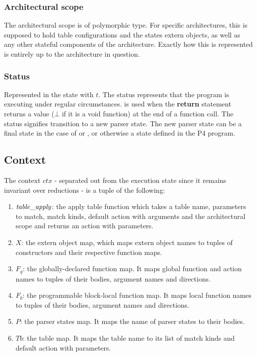 \documentclass[UTF8]{article}
\begin{document}
\subsubsection*{Architectural scope}
The architectural scope is of polymorphic type. For specific architectures, this is supposed to hold table configurations and the states extern objects, as well as any other stateful components of the architecture. Exactly how this is represented is entirely up to the architecture in question.

\subsubsection*{Status}
Represented in the state with $t$. The status \running{} represents that the program is executing under regular circumstances.  is used when the \textbf{return} statement returns a value \cval{} ($\bot$ if it is a void function) at the end of a function call. The status \trans{\vn{}} signifies transition to a new parser state. The new parser state can be a final state in the case of  or , or otherwise a state defined in the P4 program.

\subsection{Context}
The context $ctx$ - separated out from the execution state since it remains invariant over reductions - is a tuple of the following: 
\begin{enumerate}
   \item $\mathit{table\_apply}$: the apply table function which takes a table name, parameters to match, match kinds, default action with arguments and the architectural scope and returns an action with parameters.
   \item $X$: the extern object map, which maps extern object names to tuples of constructors and their respective function maps.
   \item $F_g$: the globally-declared function map. It maps global function and action names to tuples of their bodies, argument names and directions. 
   \item $F_b$: the programmable block-local function map.  It maps local function names to tuples of their bodies, argument names and directions. 
   \item $P$: the parser states map. It maps the name of parser states to their bodies.
   \item $Tb$: the table map. It maps the table name to its list of match kinds and default action with parameters.
\end{enumerate}
\end{document}

